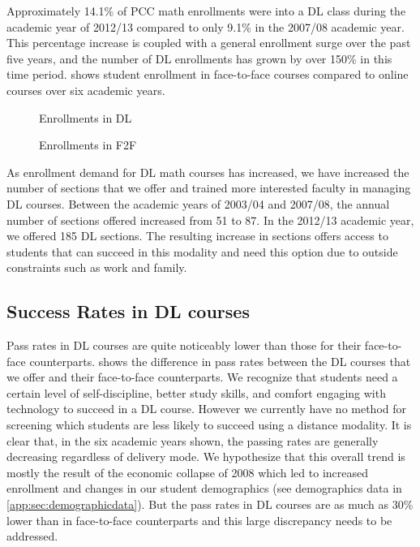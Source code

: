 Approximately 14.1\% of PCC math enrollments were into a DL class during the academic year of 2012/13 compared to only 9.1\% in the 2007/08 academic year. This percentage increase is coupled with a general enrollment surge over the past five years, and the number of DL enrollments has grown by over 150\% in this time period.  shows student enrollment in face-to-face courses compared to online courses over six academic years.

\begin{figure}[!htb]
    \begin{minipage}{.5\textwidth}
          
          \caption{Enrollments in DL}
    \end{minipage}%
    \begin{minipage}{.5\textwidth}
          
          \caption{Enrollments in F2F}
    \end{minipage}
         \label{tab:sec3:F2FandDLenrollments}
\end{figure}


As enrollment demand for DL math courses has increased, we have increased the number of sections that we offer and trained more interested faculty in managing DL courses.  Between the academic years of 2003/04 and 2007/08, the annual number of sections offered increased from 51 to 87.  In the 2012/13 academic year, we offered 185 DL sections.   The resulting increase in sections offers access to students that can succeed in this modality and need this option due to outside constraints such as work and family.


\subsection{Success Rates in DL courses}
Pass rates in DL courses are quite noticeably lower than those for their face-to-face counterparts.  shows the difference in pass rates between the DL courses that we offer and their face-to-face counterparts. We recognize that students need a certain level of self-discipline, better study skills, and comfort engaging with technology to succeed in a DL course. However we currently have no method for screening which students are less likely to succeed using a distance modality.    It is clear that, in the six academic years shown, the passing rates are generally decreasing regardless of delivery mode.  We hypothesize that this overall trend is mostly the result of the economic collapse of 2008 which led to increased enrollment and changes in our student demographics (see demographics data in \cref{app:sec:demographicdata}).  But the pass rates in DL courses are as much as 30\% lower than in face-to-face counterparts and this large discrepancy needs to be addressed.

